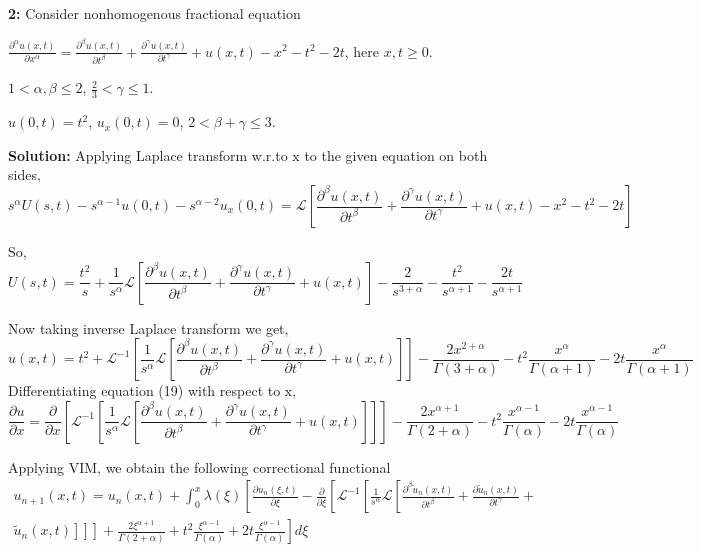 \documentclass[12pt, a4paper]{report}
\begin{document}
\clearpage
\textbf{2:} Consider nonhomogenous fractional equation\\
\begin{center}
    {\large $\frac{\partial^\alpha u(x, t)}{\partial x^\alpha} = \frac{\partial^\beta u(x, t)}{\partial t^\beta} + \frac{\partial^\gamma u(x, t)}{\partial t^\gamma} + u(x, t) - x^2 - t^2 - 2t$, here $x, t \geq 0$.}
\end{center}
\begin{center}
    $1 < \alpha, \beta \leq 2$, $\frac{2}{3} < \gamma \leq 1$. 

    $u(0, t) = t^2$, $u_x(0, t) = 0$, $2 < \beta + \gamma \leq 3$.
\end{center}


\textbf{Solution:}
Applying Laplace transform w.r.to $\mathrm{x}$ to the given equation on both sides,
$$
s^\alpha U(s, t)-s^{\alpha-1} u(0, t)-s^{\alpha-2} u_x(0, t)=\mathcal{L}\left[\frac{\partial^\beta u(x, t)}{\partial t^\beta}+\frac{\partial^\gamma u(x, t)}{\partial t^\gamma}+u(x, t)-x^2-t^2-2 t\right]
$$

So,
$$
U(s, t)=\frac{t^2}{s}+\frac{1}{s^\alpha} \mathcal{L}\left[\frac{\partial^\beta u(x, t)}{\partial t^\beta}+\frac{\partial^\gamma u(x, t)}{\partial t^\gamma}+u(x, t)\right]-\frac{2}{s^{3+\alpha}}-\frac{t^2}{s^{\alpha+1}}-\frac{2 t}{s^{\alpha+1}}
$$

Now taking inverse Laplace transform we get,
\begin{equation}
    u(x, t)=t^2+\mathcal{L}^{-1}\left[\frac{1}{s^\alpha} \mathcal{L}\left[\frac{\partial^\beta u(x, t)}{\partial t^\beta}+\frac{\partial^\gamma u(x, t)}{\partial t^\gamma}+u(x, t)\right]\right]-\frac{2 x^{2+\alpha}}{\Gamma(3+\alpha)}-t^2 \frac{x^\alpha}{\Gamma(\alpha+1)}-2 t \frac{x^\alpha}{\Gamma(\alpha+1)}
\end{equation}
Differentiating equation (19) with respect to $\mathrm{x}$,
$$
\frac{\partial u}{\partial x}=\frac{\partial}{\partial x}\left[\mathcal{L}^{-1}\left[\frac{1}{s^\alpha} \mathcal{L}\left[\frac{\partial^\beta u(x, t)}{\partial t^\beta}+\frac{\partial^\gamma u(x, t)}{\partial t^\gamma}+u(x, t)\right]\right]\right]-\frac{2 x^{\alpha+1}}{\Gamma(2+\alpha)}-t^2 \frac{x^{\alpha-1}}{\Gamma(\alpha)}-2 t \frac{x^{\alpha-1}}{\Gamma(\alpha)}
$$

Applying VIM, we obtain the following correctional functional
$$
\begin{array}{r}
u_{n+1}(x, t)=u_n(x, t)+\int_0^x \lambda(\xi)\left[\frac{\partial u_n(\xi, t)}{\partial \xi}-\frac{\partial}{\partial \xi}\left[\mathcal { L } ^ { - 1 } \left[\frac { 1 } { s ^ { \alpha } } \mathcal { L } \left[\frac{\partial^\beta \tilde{u}_n(x, t)}{\partial t^\beta}+\frac{\partial \tilde{u}_n(x, t)}{\partial t^\gamma}+\right.\right.\right.\right. \\
\left.\left.\left.\left.\tilde{u}_n(x, t)\right]\right]\right]+\frac{2 \xi^{\alpha+1}}{\Gamma(2+\alpha)}+t^2 \frac{\xi^{\alpha-1}}{\Gamma(\alpha)}+2 t \frac{\xi^{\alpha-1}}{\Gamma(\alpha)}\right] d \xi
\end{array}
$$
\end{document}
